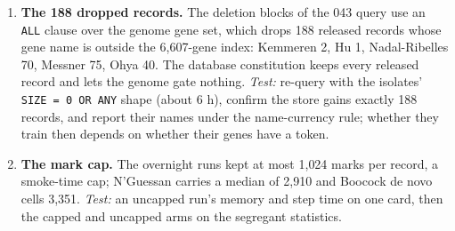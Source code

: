 \begin{enumerate}[leftmargin=*,itemsep=3pt]
\item \textbf{The 188 dropped records.} The deletion blocks of the 043 query use an
\texttt{ALL} clause over the genome gene set, which drops 188 released records whose gene
name is outside the 6{,}607-gene index: Kemmeren 2, Hu 1, Nadal-Ribelles 70, Messner 75,
Ohya 40. The database constitution keeps every released record and lets the genome gate
nothing. \emph{Test:} re-query with the isolates' \texttt{SIZE = 0 OR ANY} shape (about 6 h),
confirm the store gains exactly 188 records, and report their names under the
name-currency rule; whether they train then depends on whether their genes have a token.

\item \textbf{The mark cap.} The overnight runs kept at most 1{,}024 marks per record, a
smoke-time cap; N'Guessan carries a median of 2{,}910 and Boocock de novo cells 3{,}351.
\emph{Test:} an uncapped run's memory and step time on one card, then the capped and uncapped
arms on the segregant statistics.
\end{enumerate}

